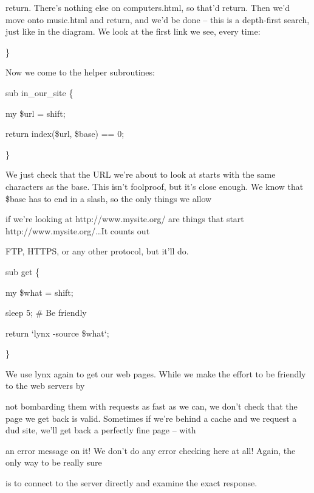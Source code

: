 \documentclass[a4paper,11pt]{book}
\begin{document}
\noindent return. There's nothing else on computers.html, so that'd return. Then we'd move onto music.html and return, and we'd be done -- this is a depth-first search, just like in the diagram. We look at the first link we see, every time:

\noindent 

\noindent \}

\noindent 

\noindent Now we come to the helper subroutines:

\noindent 

\noindent sub in\_our\_site \{

\noindent my \$url = shift;

\noindent return index(\$url, \$base) == 0;

\noindent \}

\noindent 

\noindent We just check that the URL we're about to look at starts with the same characters as the base. This isn't foolproof, but it's close enough. We know that \$base has to end in a slash, so the only things we allow

\noindent if we're looking at http://www.mysite.org/ are things that start http://www.mysite.org/\dots  It counts out

\noindent FTP, HTTPS, or any other protocol, but it'll do.

\noindent 

\noindent sub get \{

\noindent my \$what = shift;

\noindent sleep 5; \# Be friendly

\noindent return `lynx -source \$what`;

\noindent \}

\noindent 

\noindent 

\noindent We use lynx again to get our web pages. While we make the effort to be friendly to the web servers by

\noindent not bombarding them with requests as fast as we can, we don't check that the page we get back is valid. Sometimes if we're behind a cache and we request a dud site, we'll get back a perfectly fine page -- with

\noindent an error message on it! We don't do any error checking here at all! Again, the only way to be really sure

\noindent is to connect to the server directly and examine the exact response.
\end{document}
